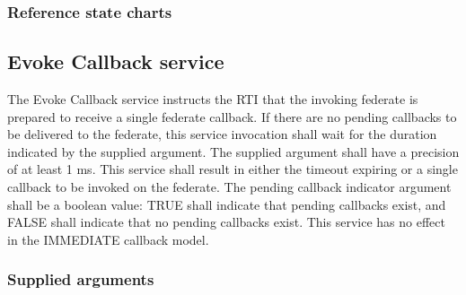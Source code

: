 \begin{compactstdpage}
    \subsubsection{Reference state charts}


    \subsection{Evoke Callback service}

    The Evoke Callback service instructs the RTI that the invoking federate is prepared to receive a single federate callback. If there are no pending callbacks to be delivered to the federate, this service invocation shall wait for the duration indicated by the supplied argument. The supplied argument shall have a precision of at least 1 ms. This service shall result in either the timeout expiring or a single callback to be invoked on the federate. The pending callback indicator argument shall be a boolean value: TRUE shall indicate that pending callbacks exist, and FALSE shall indicate that no pending callbacks exist. This service has no effect in the IMMEDIATE callback model.

    \subsubsection{Supplied arguments}

\end{compactstdpage}

\clearpage

